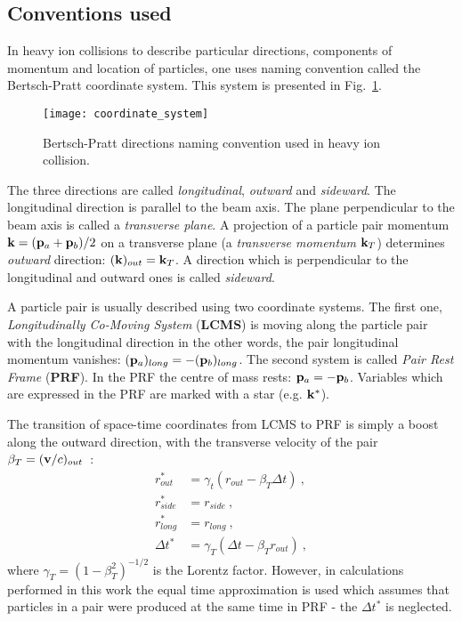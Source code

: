     \subsection{Conventions used}
      In heavy ion collisions to describe particular directions, components of momentum and location of particles, one uses naming convention called the Bertsch-Pratt coordinate system.
      This system is presented in Fig.~\ref{fig:coordinate-system}.
      \begin{figure}[h]
        \centering
        \texttt{[image: coordinate\_system]}
        \caption{Bertsch-Pratt directions naming convention used in heavy ion collision.}
        \label{fig:coordinate-system}
      \end{figure}
      The three directions are called \textit{longitudinal}, \textit{outward} and \textit{sideward}.
      The longitudinal direction is parallel to the beam axis.
      The plane perpendicular to the beam axis is called a \textit{transverse plane}.
      A projection of a particle pair momentum $\mathbf{k} = (\mathbf{p}_a + \mathbf{p}_b)/2$ on a transverse plane (a \textit{transverse momentum} $\mathbf{k}_T$) determines \textit{outward} direction: $(\mathbf{k})_{out} = \mathbf{k}_T$.
      A direction which is perpendicular to the longitudinal and outward ones is called \textit{sideward}.

      A particle pair is usually described using two coordinate systems.
      The first one, \textit{Longitudinally Co-Moving System} (\textbf{LCMS}) is moving along the particle pair with the longitudinal direction in the other words, the pair longitudinal momentum vanishes: $(\mathbf{p}_a)_{long} = -(\mathbf{p}_b)_{long} $.
      The second system is called \textit{Pair Rest Frame} (\textbf{PRF}).
      In the PRF the centre of mass rests: $\mathbf{p}_a = -\mathbf{p}_b$.
      Variables which are expressed in the PRF are marked with a star (e.g. $\mathbf{k}^{*}$).

      The transition of space-time coordinates from LCMS to PRF is simply a boost along the outward direction, with the transverse velocity of the pair~$\beta_T = (\mathbf{v}/c)_{out}$~\cite{nonidfemto}:
      \begin{align}
        \label{eq:lcmstoprf}
        r^{*}_{out} &= \gamma_{t}(r_{out} - \beta_T \Delta t)~,\\
        r^{*}_{side} &= r_{side}~,\\
        r^{*}_{long} &= r_{long}~,\\
        \Delta t^{*} &= \gamma_T(\Delta t - \beta_T r_{out})~, 
      \end{align}
      where $\gamma_T = (1-\beta^{2}_T)^{-1/2}$ is the Lorentz factor.
      However, in calculations performed in this work the equal time approximation is used which assumes that particles in a pair were produced at the same time in PRF - the $\Delta t^{*}$ is neglected.

